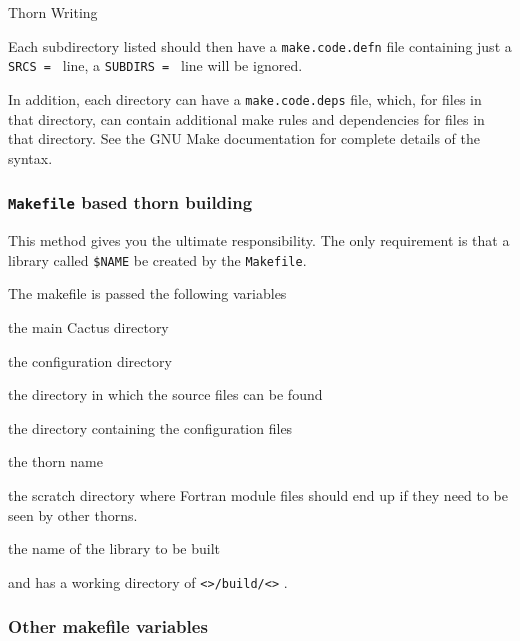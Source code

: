 \begin{cactuspart}{Thorn Writing}
\begin{itemize}
\end{itemize}

Each subdirectory listed should then have a \texttt{make.code.defn} file
containing just a \texttt{SRCS = } line, a \texttt{SUBDIRS = } line will
be ignored.

In addition, each directory can have a \texttt{make.code.deps} file, which,
for files in that directory, can contain additional make rules and dependencies
for files in that directory.  See the GNU Make documentation for complete details of the
syntax.

\subsubsection{\texttt{Makefile} based thorn building}

This method gives you the ultimate responsibility.
The only requirement is that
a library called \texttt{\$NAME} be created by the \texttt{Makefile}.

The makefile is passed the following variables
\begin{Lentry}

\item [\texttt{\$(CCTK\_HOME)}]  the main Cactus directory

\item [\texttt{\$(TOP)}] the configuration directory

\item [\texttt{\$(SRCDIR)}] the directory in which the source files can be found

\item [\texttt{\$(CONFIG)}]  the directory containing the configuration files

\item [\texttt{\$(THORN)}]   the thorn name

\item [\texttt{\$(SCRATCH\_BUILD)}]  the scratch directory where Fortran module
files should end up if they need to be seen by other thorns.

\item [\texttt{\$(NAME)}] the name of the library to be built

\end{Lentry}

and has a working directory of
\texttt{<>/build/<>} .

\subsubsection{Other makefile variables}


\end{cactuspart}
